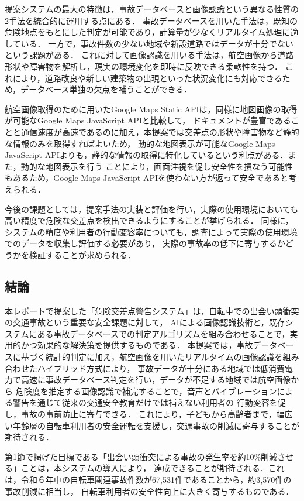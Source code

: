 \documentclass[uplatex,dvipdfmx]{jsarticle}
\begin{document}
提案システムの最大の特徴は，事故データベースと画像認識という異なる性質の2手法を統合的に運用する点にある．
事故データベースを用いた手法は，既知の危険地点をもとにした判定が可能であり，計算量が少なくリアルタイム処理に適している．
一方で，事故件数の少ない地域や新設道路ではデータが十分でないという課題がある．
これに対して画像認識を用いる手法は，航空画像から道路形状や障害物を解析し，現実の環境変化を即時に反映できる柔軟性を持つ．
これにより，道路改良や新しい建築物の出現といった状況変化にも対応できるため，データベース単独の欠点を補うことができる．

航空画像取得のために用いたGoogle Maps Static APIは，同様に地図画像の取得が可能なGoogle Maps JavaScript APIと比較して，
ドキュメントが豊富であることと通信速度が高速であるのに加え，本提案では交差点の形状や障害物など静的な情報のみを取得すればよいため，
動的な地図表示が可能なGoogle Maps JavaScript APIよりも，静的な情報の取得に特化しているという利点がある．また，動的な地図表示を行う
ことにより，画面注視を促し安全性を損なう可能性もあるため，Google Maps JavaScript APIを使わない方が返って安全であると考えられる．

今後の課題としては，提案手法の実装と評価を行い，実際の使用環境においても高い精度で危険な交差点を検出できるようにすることが挙げられる．
同様に，システムの精度や利用者の行動変容率についても，調査によって実際の使用環境でのデータを収集し評価する必要があり，
実際の事故率の低下に寄与するかどうかを検証することが求められる．

\subsection{結論}
本レポートで提案した「危険交差点警告システム」は，自転車での出会い頭衝突の交通事故という重要な安全課題に対して，
AIによる画像認識技術と，既存システムにある事故データベースでの判定アルゴリズムを組み合わせることで，実用的かつ効果的な解決策を提供するものである．
本提案では，事故データベースに基づく統計的判定に加え，航空画像を用いたリアルタイムの画像認識を組み合わせたハイブリッド方式により，
事故データが十分にある地域では低消費電力で高速に事故データベース判定を行い，データが不足する地域では航空画像から
危険度を推定する画像認識で補完することで，音声とバイブレーションによる警告を通じて従来の交通安全教育だけでは補えない利用者の
行動変容を促し，事故の事前防止に寄与できる．
これにより，子どもから高齢者まで，幅広い年齢層の自転車利用者の安全運転を支援し，交通事故の削減に寄与することが期待される．

第1節で掲げた目標である「出会い頭衝突による事故の発生率を約10\%削減させる」ことは，本システムの導入により，
達成できることが期待される．これは，令和６年中の自転車関連事故件数が67,531件であることから，約3,570件の事故削減に相当し，
自転車利用者の安全性向上に大きく寄与するものである．
\end{document}
